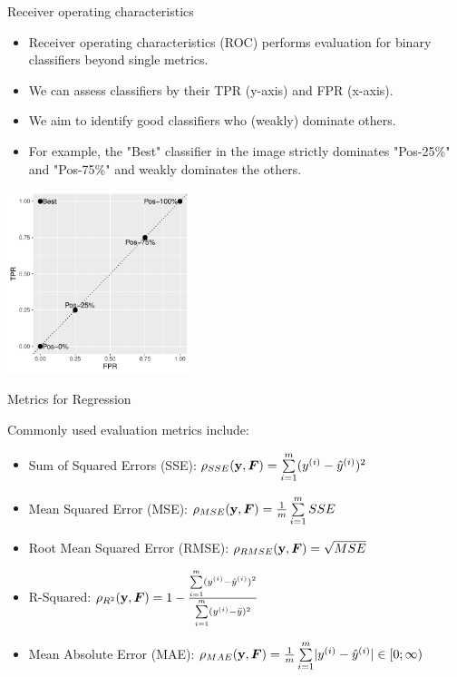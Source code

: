 \documentclass[11pt,compress,t,notes=noshow, xcolor=table]{beamer}
\begin{document}
\begin{vbframe}{Receiver operating characteristics}

\begin{itemize}
\item Receiver operating characteristics (ROC) performs evaluation for binary classifiers beyond single metrics.
\item We can assess classifiers by their TPR (y-axis) and FPR (x-axis).
\item We aim to identify good classifiers who (weakly) dominate others. 
\item For example, the "Best" classifier in the image strictly dominates "Pos-25\%" and "Pos-75\%" and weakly dominates the others.
\end{itemize}
\begin{center}
    {\centering \includegraphics[width=0.4\textwidth]{figure/eval_mclass_roc_sp_2}}
    \end{center}


\end{vbframe}


\begin{vbframe}{Metrics for Regression}

Commonly used evaluation metrics include:
\begin{itemize}
\item Sum of Squared Errors (SSE): $\rho_{SSE}(\mathbf{y}, \boldsymbol{F})=\sum\limits_{i=1}^m (y^{(i)}- \hat{y}^{(i)})^2$
\item Mean Squared Error (MSE): $\rho_{MSE}(\mathbf{y}, \boldsymbol{F})=\frac{1}{m} \sum\limits_{i=1}^m SSE$
\item Root Mean Squared Error (RMSE): $\rho_{RMSE}(\mathbf{y}, \boldsymbol{F})= \sqrt{MSE}$
\item R-Squared: $\rho_{R^2}(\mathbf{y}, \boldsymbol{F}) = 1 - \frac{\sum\limits_{i=1}^m (y^{(i)}- \hat{y}^{(i)})^2}{\sum\limits_{i=1}^m (y^{(i)} - \bar{y})^2}$
\item Mean Absolute Error (MAE): $\rho_{MAE}(\mathbf{y}, \boldsymbol{F}) = \frac{1}{m} \sum\limits_{i=1}^m \rvert y^{(i)}- \hat{y}^{(i)} \rvert \in [0;\infty) \qquad$
\end{itemize}

\end{vbframe}
\end{document}

